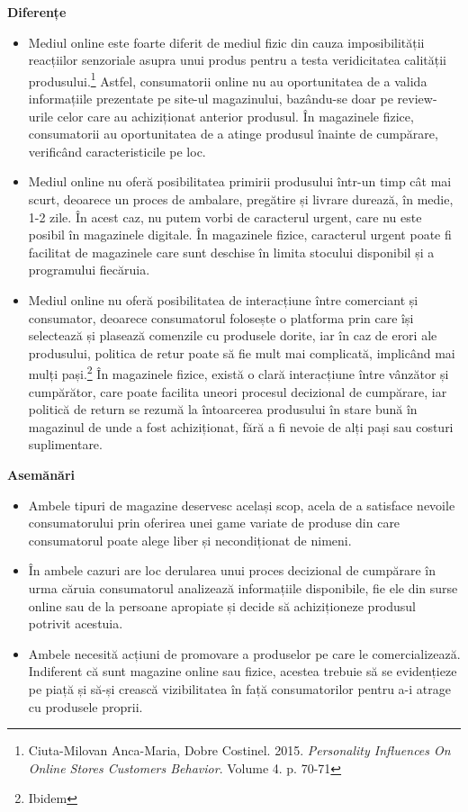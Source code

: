\documentclass[a4paper, 12pt]{article}
\begin{document}
	\quad \textbf{Diferențe}
	\begin{itemize}
		\item Mediul online este foarte diferit  de mediul fizic din cauza imposibilității reacțiilor senzoriale asupra unui produs pentru a testa veridicitatea calității produsului.\footnote{Ciuta-Milovan Anca-Maria, Dobre Costinel. 2015. \textit{Personality Influences On Online Stores Customers Behavior}. Volume 4. p. 70-71} Astfel, consumatorii online nu au oportunitatea de a valida informațiile prezentate pe site-ul magazinului, bazându-se doar pe review-urile celor care au achiziționat anterior produsul. În magazinele fizice, consumatorii au oportunitatea de a atinge produsul înainte de cumpărare, verificând caracteristicile pe loc.
		\item Mediul online nu oferă posibilitatea primirii produsului într-un timp cât mai scurt, deoarece un proces de ambalare, pregătire și livrare durează, în medie, 1-2 zile. În acest caz, nu putem vorbi de caracterul urgent, care nu este posibil în magazinele digitale. În magazinele fizice, caracterul urgent poate fi facilitat de magazinele care sunt deschise în limita stocului disponibil și a programului fiecăruia.
		\item Mediul online nu oferă posibilitatea de interacțiune între comerciant și consumator, deoarece consumatorul folosește o platforma prin care își selectează și plasează comenzile cu produsele dorite, iar în caz de erori ale produsului, politica de retur poate să fie mult mai complicată, implicând mai mulți pași.\footnote{Ibidem} În magazinele fizice, există o clară interacțiune între vânzător și cumpărător, care poate facilita uneori procesul decizional de cumpărare, iar politică de return se rezumă la întoarcerea produsului în stare bună în magazinul de unde a fost achiziționat, fără a fi nevoie de alți pași sau costuri suplimentare.
	\end{itemize}
	\qquad\space \textbf{Asemănări}
	\begin{itemize}
		\item Ambele tipuri de magazine deservesc același scop, acela de a satisface nevoile consumatorului prin oferirea unei game variate de produse din care consumatorul poate alege liber și necondiționat de nimeni.
		\item În ambele cazuri are loc derularea unui proces decizional de cumpărare în urma căruia consumatorul analizează informațiile disponibile, fie ele din surse online sau de la persoane apropiate și decide să achiziționeze produsul potrivit acestuia. 
		\item Ambele necesită acțiuni de promovare a produselor pe care le comercializează. Indiferent că sunt magazine online sau fizice, acestea trebuie să se evidențieze pe piață și să-și crească vizibilitatea în față consumatorilor pentru a-i atrage cu produsele proprii.
	\end{itemize}
	
\end{document}
